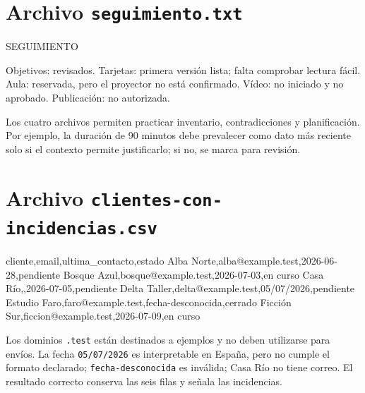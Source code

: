 \documentclass[10pt,a4paper,openany]{book}
\newenvironment{Shaded}{}{}
\newcommand{\NormalTok}[1]{#1}
\renewenvironment{Shaded}
  {\begin{tcolorbox}[
    enhanced,
    breakable,
    colback=CodeBg,
    colframe=Border,
    boxrule=0.5pt,
    arc=2mm,
    left=3mm,
    right=3mm,
    top=2.2mm,
    bottom=2.2mm,
    before skip=0.8em,
    after skip=0.9em
  ]}
  {\end{tcolorbox}}
\begin{document}
\section{\texorpdfstring{Archivo
\texttt{seguimiento.txt}}{Archivo seguimiento.txt}}\label{archivo-seguimiento.txt}

\begin{Shaded}
\begin{Highlighting}[]
\NormalTok{SEGUIMIENTO}

\NormalTok{Objetivos: revisados.}
\NormalTok{Tarjetas: primera versión lista; falta comprobar lectura fácil.}
\NormalTok{Aula: reservada, pero el proyector no está confirmado.}
\NormalTok{Vídeo: no iniciado y no aprobado.}
\NormalTok{Publicación: no autorizada.}
\end{Highlighting}
\end{Shaded}

Los cuatro archivos permiten practicar inventario, contradicciones y
planificación. Por ejemplo, la duración de 90 minutos debe prevalecer
como dato más reciente solo si el contexto permite justificarlo; si no,
se marca para revisión.

\section{\texorpdfstring{Archivo
\texttt{clientes-con-incidencias.csv}}{Archivo clientes-con-incidencias.csv}}\label{archivo-clientes-con-incidencias.csv}

\begin{Shaded}
\begin{Highlighting}[]
\NormalTok{cliente,email,ultima\_contacto,estado}
\NormalTok{Alba Norte,alba@example.test,2026{-}06{-}28,pendiente}
\NormalTok{Bosque Azul,bosque@example.test,2026{-}07{-}03,en curso}
\NormalTok{Casa Río,,2026{-}07{-}05,pendiente}
\NormalTok{Delta Taller,delta@example.test,05/07/2026,pendiente}
\NormalTok{Estudio Faro,faro@example.test,fecha{-}desconocida,cerrado}
\NormalTok{Ficción Sur,ficcion@example.test,2026{-}07{-}09,en curso}
\end{Highlighting}
\end{Shaded}

Los dominios \texttt{.test} están destinados a ejemplos y no deben
utilizarse para envíos. La fecha \texttt{05/07/2026} es interpretable en
España, pero no cumple el formato declarado; \texttt{fecha-desconocida}
es inválida; Casa Río no tiene correo. El resultado correcto conserva
las seis filas y señala las incidencias.
\end{document}
